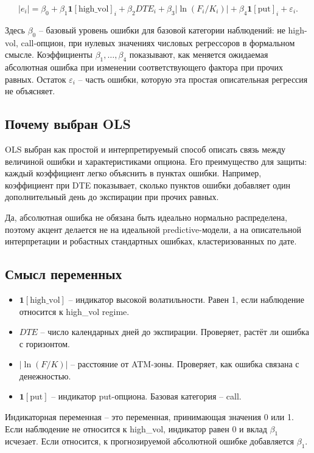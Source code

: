 \documentclass[11pt,a4paper]{article}
\begin{document}
\begin{equation}
|e_i|
=
\beta_0
+ \beta_1\mathbf{1}[\text{high\_vol}]_i
+ \beta_2DTE_i
+ \beta_3\left|\ln(F_i/K_i)\right|
+ \beta_4\mathbf{1}[\text{put}]_i
+ \varepsilon_i.
\end{equation}

Здесь $\beta_0$ -- базовый уровень ошибки для базовой категории наблюдений: не high-vol, call-опцион, при нулевых значениях числовых регрессоров в формальном смысле. Коэффициенты $\beta_1,\ldots,\beta_4$ показывают, как меняется ожидаемая абсолютная ошибка при изменении соответствующего фактора при прочих равных. Остаток $\varepsilon_i$ -- часть ошибки, которую эта простая описательная регрессия не объясняет.

\subsection{Почему выбран OLS}

OLS выбран как простой и интерпретируемый способ описать связь между величиной ошибки и характеристиками опциона. Его преимущество для защиты: каждый коэффициент легко объяснить в пунктах ошибки. Например, коэффициент при DTE показывает, сколько пунктов ошибки добавляет один дополнительный день до экспирации при прочих равных.

Да, абсолютная ошибка не обязана быть идеально нормально распределена, поэтому акцент делается не на идеальной predictive-модели, а на описательной интерпретации и робастных стандартных ошибках, кластеризованных по дате.
\subsection{Смысл переменных}

\begin{itemize}
    \item $\mathbf{1}[\text{high\_vol}]$ -- индикатор высокой волатильности. Равен 1, если наблюдение относится к high\_vol regime.
    \item $DTE$ -- число календарных дней до экспирации. Проверяет, растёт ли ошибка с горизонтом.
    \item $\left|\ln(F/K)\right|$ -- расстояние от ATM-зоны. Проверяет, как ошибка связана с денежностью.
    \item $\mathbf{1}[\text{put}]$ -- индикатор put-опциона. Базовая категория -- call.
\end{itemize}

Индикаторная переменная -- это переменная, принимающая значения 0 или 1. Если наблюдение не относится к high\_vol, индикатор равен 0 и вклад $\beta_1$ исчезает. Если относится, к прогнозируемой абсолютной ошибке добавляется $\beta_1$.
\end{document}
